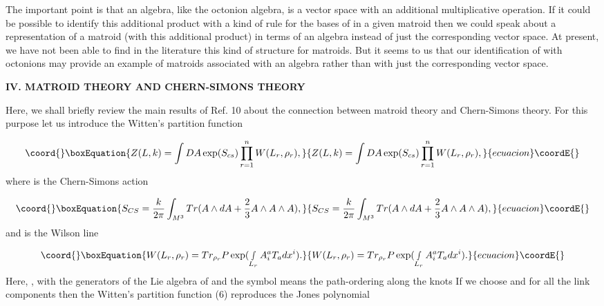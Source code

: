 \documentclass[a4paper,12pt]{article}
\begin{document}
The important point is that an algebra, like the octonion algebra, is a
vector space with an additional multiplicative operation. If it could be
possible to identify this additional product with a kind of rule for the
bases of \coordHE{} in a given matroid then we could speak about a
representation of a matroid (with this additional product) in terms of an
algebra instead of just the corresponding vector space. At present, we have
not been able to find in the literature this kind of structure for matroids.
But it seems to us that our identification of \coordHE{} with octonions
may provide an example of matroids associated with an algebra rather than
with just the corresponding vector space.

\bigskip

\smallskip

\noindent \textbf{IV. MATROID THEORY AND CHERN-SIMONS THEORY}

\bigskip

Here, we shall briefly review the main results of Ref. 10 about the
connection between matroid theory and Chern-Simons theory. For this purpose
let us introduce the Witten's partition function

\begin{equation}\coord{}\boxEquation{
Z(L,k)=\int DA\exp (S_{cs})\prod\limits_{r=1}^{n}W(L_{r},\rho _{r}),
\label{6}
}{
Z(L,k)=\int DA\exp (S_{cs})\prod\limits_{r=1}^{n}W(L_{r},\rho _{r}),
}{ecuacion}\coordE{}\end{equation}
where \coordHE{} is the Chern-Simons action

\begin{equation}\coord{}\boxEquation{
S_{CS}=\frac{k}{2\pi }\int_{M^{3}}Tr(A\wedge dA+\frac{2}{3}A\wedge A\wedge
A),  \label{7}
}{
S_{CS}=\frac{k}{2\pi }\int_{M^{3}}Tr(A\wedge dA+\frac{2}{3}A\wedge A\wedge
A),  }{ecuacion}\coordE{}\end{equation}
and \coordHE{} is the Wilson line

\begin{equation}\coord{}\boxEquation{
W(L_{r},\rho _{r})=Tr_{\rho _{r}}P\exp (\smallint
_{L_{r}}A_{i}^{a}T_{a}dx^{i}).  \label{8}
}{
W(L_{r},\rho _{r})=Tr_{\rho _{r}}P\exp (\smallint
_{L_{r}}A_{i}^{a}T_{a}dx^{i}).  }{ecuacion}\coordE{}\end{equation}
Here, \coordHE{}, with \coordHE{} the generators of the Lie
algebra of \coordHE{} and the symbol \coordHE{} means the path-ordering along the knots \coordHE{} If we choose \coordHE{}  \coordHE{} and \coordHE{} for all
the link components then the Witten's partition function (6) reproduces the
Jones polynomial
\end{document}

